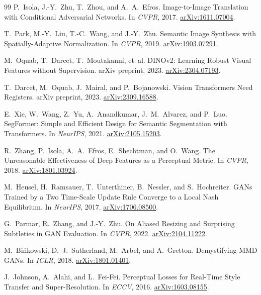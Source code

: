 \documentclass[11pt]{article}
\begin{document}
\begin{thebibliography}{99}
P.~Isola, J.-Y.~Zhu, T.~Zhou, and A.~A.~Efros.
\newblock Image-to-Image Translation with Conditional Adversarial Networks.
\newblock In \emph{CVPR}, 2017. \href{https://arxiv.org/abs/1611.07004}{arXiv:1611.07004}.

T.~Park, M.-Y.~Liu, T.-C.~Wang, and J.-Y.~Zhu.
\newblock Semantic Image Synthesis with Spatially-Adaptive Normalization.
\newblock In \emph{CVPR}, 2019. \href{https://arxiv.org/abs/1903.07291}{arXiv:1903.07291}.

M.~Oquab, T.~Darcet, T.~Moutakanni, et~al.
\newblock DINOv2: Learning Robust Visual Features without Supervision.
\newblock arXiv preprint, 2023. \href{https://arxiv.org/abs/2304.07193}{arXiv:2304.07193}.

T.~Darcet, M.~Oquab, J.~Mairal, and P.~Bojanowski.
\newblock Vision Transformers Need Registers.
\newblock arXiv preprint, 2023. \href{https://arxiv.org/abs/2309.16588}{arXiv:2309.16588}.

E.~Xie, W.~Wang, Z.~Yu, A.~Anandkumar, J.~M.~Alvarez, and P.~Luo.
\newblock SegFormer: Simple and Efficient Design for Semantic Segmentation with Transformers.
\newblock In \emph{NeurIPS}, 2021. \href{https://arxiv.org/abs/2105.15203}{arXiv:2105.15203}.

R.~Zhang, P.~Isola, A.~A.~Efros, E.~Shechtman, and O.~Wang.
\newblock The Unreasonable Effectiveness of Deep Features as a Perceptual Metric.
\newblock In \emph{CVPR}, 2018. \href{https://arxiv.org/abs/1801.03924}{arXiv:1801.03924}.

M.~Heusel, H.~Ramsauer, T.~Unterthiner, B.~Nessler, and S.~Hochreiter.
\newblock GANs Trained by a Two Time-Scale Update Rule Converge to a Local Nash Equilibrium.
\newblock In \emph{NeurIPS}, 2017. \href{https://arxiv.org/abs/1706.08500}{arXiv:1706.08500}.

G.~Parmar, R.~Zhang, and J.-Y.~Zhu.
\newblock On Aliased Resizing and Surprising Subtleties in GAN Evaluation.
\newblock In \emph{CVPR}, 2022. \href{https://arxiv.org/abs/2104.11222}{arXiv:2104.11222}.

M.~Bi{\'n}kowski, D.~J.~Sutherland, M.~Arbel, and A.~Gretton.
\newblock Demystifying MMD GANs.
\newblock In \emph{ICLR}, 2018. \href{https://arxiv.org/abs/1801.01401}{arXiv:1801.01401}.

J.~Johnson, A.~Alahi, and L.~Fei-Fei.
\newblock Perceptual Losses for Real-Time Style Transfer and Super-Resolution.
\newblock In \emph{ECCV}, 2016. \href{https://arxiv.org/abs/1603.08155}{arXiv:1603.08155}.


\end{thebibliography}
\end{document}
